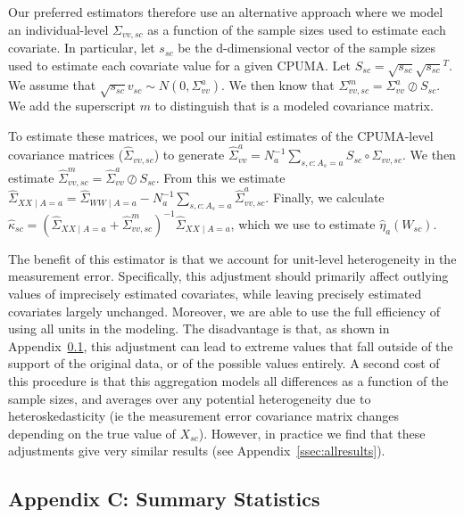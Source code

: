 \documentclass[12pt]{article}
\begin{document}
Our preferred estimators therefore use an alternative approach where we model an individual-level $\Sigma_{vv, sc}$ as a function of the sample sizes used to estimate each covariate. In particular, let $s_{sc}$ be the d-dimensional vector of the sample sizes used to estimate each covariate value for a given CPUMA. Let $S_{sc} = \sqrt{s_{sc}}\sqrt{s_{sc}}^T$. We assume that $\sqrt{s_{sc}}v_{sc} \sim N(0, \Sigma_{vv}^a)$. We then know that $\Sigma_{vv, sc}^m = \Sigma_{vv}^a \oslash S_{sc}$. We add the superscript $m$ to distinguish that is a modeled covariance matrix.

To estimate these matrices, we pool our initial estimates of the CPUMA-level covariance matrices ($\hat{\Sigma}_{vv, sc}$) to generate $\hat{\Sigma}_{vv}^a = N_a^{-1}\sum_{s, c: A_s = a} S_{sc} \circ \Sigma_{vv, sc}$. We then estimate $\hat{\Sigma}_{vv, sc}^m = \hat{\Sigma}_{vv}^a \oslash S_{sc}$. From this we estimate $\hat{\Sigma}_{XX \mid A = a} = \hat{\Sigma}_{WW \mid A = a} - N_a^{-1}\sum_{s, c: A_s = a}\hat{\Sigma}_{vv, sc}^a$. Finally, we calculate $\hat{\kappa}_{sc} = (\hat{\Sigma}_{XX \mid A = a} + \hat{\Sigma}_{vv, sc}^m)^{-1}\hat{\Sigma}_{XX \mid A = a}$, which we use to estimate $\hat{\eta}_a(W_{sc})$. 

The benefit of this estimator is that we account for unit-level heterogeneity in the measurement error. Specifically, this adjustment should primarily affect outlying values of imprecisely estimated covariates, while leaving precisely estimated covariates largely unchanged. Moreover, we are able to use the full efficiency of using all units in the modeling. The disadvantage is that, as shown in Appendix~\ref{sec:appendixsumstat}, this adjustment can lead to extreme values that fall outside of the support of the original data, or of the possible values entirely. A second cost of this procedure is that this aggregation models all differences as a function of the sample sizes, and averages over any potential heterogeneity due to heteroskedasticity (ie the measurement error covariance matrix changes depending on the true value of $X_{sc}$). However, in practice we find that these adjustments give very similar results (see Appendix~\ref{ssec:allresults}).

\subsection{Appendix C: Summary Statistics}
\label{sec:appendixsumstat}
\end{document}
